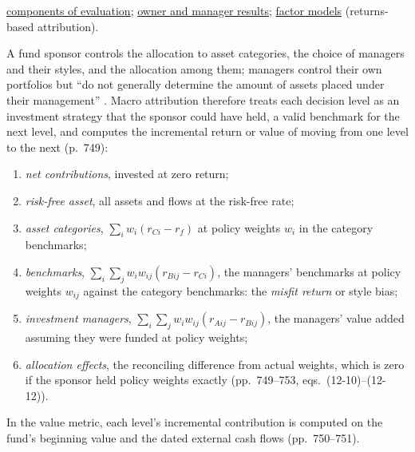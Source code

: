 \begin{qfmethod}
 \hyperref[def:performance-evaluation-components]{components of evaluation}; \hyperref[meth:macro-attribution-owner-manager]{owner and manager results}; \hyperref[def:factor-model-types]{factor models} (returns-based attribution).

\end{qfmethod}

\begin{qfmethod}\label{meth:macro-attribution-owner-manager}
 A fund sponsor controls the allocation to asset categories, the choice of managers and their styles, and the allocation among them; managers control their own portfolios but ``do not generally determine the amount of assets placed under their management'' \citep[chap.~12, pp.~746 and~752]{managing-investment-portfolios-2007}. Macro attribution therefore treats each decision level as an investment strategy that the sponsor could have held, a valid benchmark for the next level, and computes the incremental return or value of moving from one level to the next (p.~749):
\begin{enumerate}
\item \emph{net contributions}, invested at zero return;
\item \emph{risk-free asset}, all assets and flows at the risk-free rate;
\item \emph{asset categories}, $\sum_iw_i(r_{Ci}-r_f)$ at policy weights $w_i$ in the category benchmarks;
\item \emph{benchmarks}, $\sum_i\sum_jw_iw_{ij}(r_{Bij}-r_{Ci})$, the managers' benchmarks at policy weights $w_{ij}$ against the category benchmarks: the \emph{misfit return} or style bias;
\item \emph{investment managers}, $\sum_i\sum_jw_iw_{ij}(r_{Aij}-r_{Bij})$, the managers' value added assuming they were funded at policy weights;
\item \emph{allocation effects}, the reconciling difference from actual weights, which is zero if the sponsor held policy weights exactly (pp.~749--753, eqs.~(12-10)--(12-12)).
\end{enumerate}
In the value metric, each level's incremental contribution is computed on the fund's beginning value and the dated external cash flows (pp.~750--751).


\end{qfmethod}
